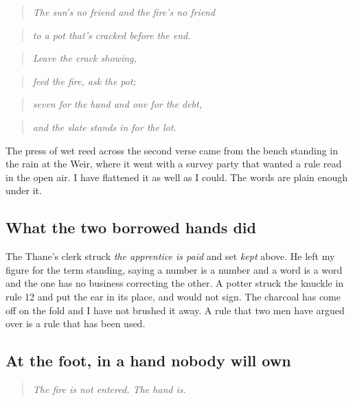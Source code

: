 \documentclass{design/chronicle}
\begin{document}
\begin{quote}\itshape The sun’s no friend and the fire’s no friend\end{quote}

\begin{quote}\itshape to a pot that’s cracked before the end.\end{quote}

\begin{quote}\itshape \end{quote}

\begin{quote}\itshape Leave the crack showing,\end{quote}

\begin{quote}\itshape feed the fire, ask the pot;\end{quote}

\begin{quote}\itshape seven for the hand and one for the debt,\end{quote}

\begin{quote}\itshape and the slate stands in for the lot.\end{quote}

The press of wet reed across the second verse came from the bench standing in the rain at the Weir, where it went with a survey party that wanted a rule read in the open air. I have flattened it as well as I could. The words are plain enough under it.

\subsection*{What the two borrowed hands did}

The Thane’s clerk struck \emph{the apprentice is paid} and set \emph{kept} above. He left my figure for the term standing, saying a number is a number and a word is a word and the one has no business correcting the other. A potter struck the knuckle in rule 12 and put the ear in its place, and would not sign. The charcoal has come off on the fold and I have not brushed it away. A rule that two men have argued over is a rule that has been used.

\subsection*{At the foot, in a hand nobody will own}

\begin{quote}\itshape The fire is not entered. The hand is.\end{quote}
\end{document}
